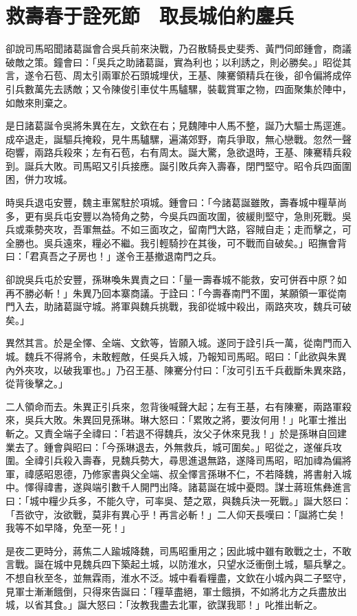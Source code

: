 
\chapter{救壽春于詮死節　取長城伯約鏖兵}

卻說司馬昭聞諸葛誕會合吳兵前來決戰，乃召散騎長史斐秀、黃門伺郎鍾會，商議破敵之策。鐘會曰：「吳兵之助諸葛誕，實為利也；以利誘之，則必勝矣。」昭從其言，遂令石苞、周太引兩軍於石頭城埋伏，王基、陳騫領精兵在後，卻令偏將成倅引兵數萬先去誘敵；又令陳俊引車仗牛馬驢騾，裝載賞軍之物，四面聚集於陣中，如敵來則棄之。

是日諸葛誕令吳將朱異在左，文欽在右；見魏陣中人馬不整，誕乃大驅士馬逕進。成卒退走，誕驅兵掩殺，見牛馬驢騾，遍滿郊野，南兵爭取，無心戀戰。忽然一聲砲響，兩路兵殺來；左有石苞，右有周太。誕大驚，急欲退時，王基、陳騫精兵殺到。誕兵大敗。司馬昭又引兵接應。誕引敗兵奔入壽春，閉門堅守。昭令兵四面圍困，併力攻城。

時吳兵退屯安豐，魏主車駕駐於項城。鍾會曰：「今諸葛誕雖敗，壽春城中糧草尚多，更有吳兵屯安豐以為犄角之勢，今吳兵四面攻圍，彼緩則堅守，急則死戰。吳兵或乘勢夾攻，吾軍無益。不如三面攻之，留南門大路，容賊自走；走而擊之，可全勝也。吳兵遠來，糧必不繼。我引輕騎抄在其後，可不戰而自破矣。」昭撫會背曰：「君真吾之子房也！」遂令王基撤退南門之兵。

卻說吳兵屯於安豐，孫琳喚朱異責之曰：「量一壽春城不能救，安可併吞中原？如再不勝必斬！」朱異乃回本寨商議。于詮曰：「今壽春南門不圍，某願領一軍從南門入去，助諸葛誕守城。將軍與魏兵挑戰，我卻從城中殺出，兩路夾攻，魏兵可破矣。」

異然其言。於是全懌、全端、文欽等，皆願入城。遂同于詮引兵一萬，從南門而入城。魏兵不得將令，未敢輕敵，任吳兵入城，乃報知司馬昭。昭曰：「此欲與朱異內外夾攻，以破我軍也。」乃召王基、陳騫分付曰：「汝可引五千兵截斷朱異來路，從背後擊之。」

二人領命而去。朱異正引兵來，忽背後喊聲大起；左有王基，右有陳騫，兩路軍殺來，吳兵大敗。朱異回見孫琳。琳大怒曰：「累敗之將，要汝何用！」叱軍士推出斬之。又責全端子全禕曰：「若退不得魏兵，汝父子休來見我！」於是孫琳自回建業去了。鍾會與昭曰：「今孫琳退去，外無救兵，城可圍矣。」昭從之，遂催兵攻圍。全禕引兵殺入壽春，見魏兵勢大，尋思進退無路，遂降司馬昭，昭加禕為偏將軍，禕感昭恩德，乃修家書與父全端、叔全懌言孫琳不仁，不若降魏，將書射入城中。懌得禕書，遂與端引數千人開門出降。諸葛誕在城中憂悶。謀士蔣班焦彝進言曰：「城中糧少兵多，不能久守，可率吳、楚之眾，與魏兵決一死戰。」誕大怒曰：「吾欲守，汝欲戰，莫非有異心乎！再言必斬！」二人仰天長嘆曰：「誕將亡矣！我等不如早降，免至一死！」

是夜二更時分，蔣焦二人踰城降魏，司馬昭重用之；因此城中雖有敢戰之士，不敢言戰。誕在城中見魏兵四下築起土城，以防淮水，只望水泛衝倒土城，驅兵擊之。不想自秋至冬，並無霖雨，淮水不泛。城中看看糧盡，文欽在小城內與二子堅守，見軍士漸漸餓倒，只得來告誕曰：「糧草盡絕，軍士餓損，不如將北方之兵盡放出城，以省其食。」誕大怒曰：「汝教我盡去北軍，欲謀我耶！」叱推出斬之。


